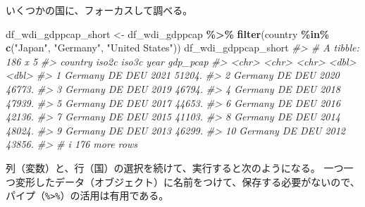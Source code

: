 \documentclass[
  xelatex, ja=standard]{bxjsbook}
\newenvironment{Shaded}{\begin{snugshade}}{\end{snugshade}}
\newcommand{\CommentTok}[1]{\textcolor[rgb]{0.56,0.35,0.01}{\textit{#1}}}
\newcommand{\FunctionTok}[1]{\textcolor[rgb]{0.13,0.29,0.53}{\textbf{#1}}}
\newcommand{\NormalTok}[1]{#1}
\newcommand{\OtherTok}[1]{\textcolor[rgb]{0.56,0.35,0.01}{#1}}
\newcommand{\SpecialCharTok}[1]{\textcolor[rgb]{0.81,0.36,0.00}{\textbf{#1}}}
\newcommand{\StringTok}[1]{\textcolor[rgb]{0.31,0.60,0.02}{#1}}
\theoremstyle{definition}
\theoremstyle{definition}
\theoremstyle{definition}
\theoremstyle{definition}
\theoremstyle{remark}
\begin{document}
いくつかの国に、フォーカスして調べる。

\begin{Shaded}
\begin{Highlighting}[]
\NormalTok{df\_wdi\_gdppcap\_short }\OtherTok{\textless{}{-}}\NormalTok{ df\_wdi\_gdppcap }\SpecialCharTok{\%\textgreater{}\%} 
  \FunctionTok{filter}\NormalTok{(country }\SpecialCharTok{\%in\%} \FunctionTok{c}\NormalTok{(}\StringTok{"Japan"}\NormalTok{, }\StringTok{"Germany"}\NormalTok{, }\StringTok{"United States"}\NormalTok{))}
\NormalTok{df\_wdi\_gdppcap\_short}
\CommentTok{\#\textgreater{} \# A tibble: 186 x 5}
\CommentTok{\#\textgreater{}    country iso2c iso3c  year gdp\_pcap}
\CommentTok{\#\textgreater{}    \textless{}chr\textgreater{}   \textless{}chr\textgreater{} \textless{}chr\textgreater{} \textless{}dbl\textgreater{}    \textless{}dbl\textgreater{}}
\CommentTok{\#\textgreater{}  1 Germany DE    DEU    2021   51204.}
\CommentTok{\#\textgreater{}  2 Germany DE    DEU    2020   46773.}
\CommentTok{\#\textgreater{}  3 Germany DE    DEU    2019   46794.}
\CommentTok{\#\textgreater{}  4 Germany DE    DEU    2018   47939.}
\CommentTok{\#\textgreater{}  5 Germany DE    DEU    2017   44653.}
\CommentTok{\#\textgreater{}  6 Germany DE    DEU    2016   42136.}
\CommentTok{\#\textgreater{}  7 Germany DE    DEU    2015   41103.}
\CommentTok{\#\textgreater{}  8 Germany DE    DEU    2014   48024.}
\CommentTok{\#\textgreater{}  9 Germany DE    DEU    2013   46299.}
\CommentTok{\#\textgreater{} 10 Germany DE    DEU    2012   43856.}
\CommentTok{\#\textgreater{} \# i 176 more rows}
\end{Highlighting}
\end{Shaded}

列（変数）と、行（国）の選択を続けて、実行すると次のようになる。 一つ一つ変形したデータ（オブジェクト）に名前をつけて、保存する必要がないので、パイプ（\texttt{\%\textgreater{}\%}）の活用は有用である。
\end{document}
